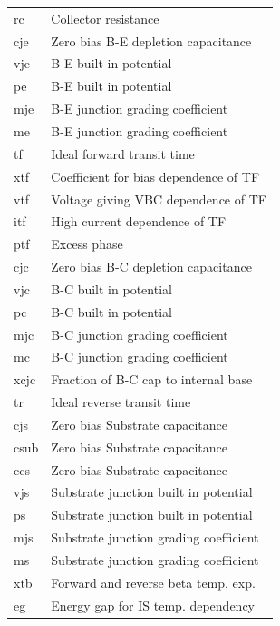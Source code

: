 \begin{longtable}{l l}
{\small rc} & {\small Collector resistance} \\
{\small cje} & {\small Zero bias B-E depletion capacitance} \\
{\small vje} & {\small B-E built in potential} \\
{\small pe} & {\small B-E built in potential} \\
{\small mje} & {\small B-E junction grading coefficient} \\
{\small me} & {\small B-E junction grading coefficient} \\
{\small tf} & {\small Ideal forward transit time} \\
{\small xtf} & {\small Coefficient for bias dependence of TF} \\
{\small vtf} & {\small Voltage giving VBC dependence of TF} \\
{\small itf} & {\small High current dependence of TF} \\
{\small ptf} & {\small Excess phase} \\
{\small cjc} & {\small Zero bias B-C depletion capacitance} \\
{\small vjc} & {\small B-C built in potential} \\
{\small pc} & {\small B-C built in potential} \\
{\small mjc} & {\small B-C junction grading coefficient} \\
{\small mc} & {\small B-C junction grading coefficient} \\
{\small xcjc} & {\small Fraction of B-C cap to internal base} \\
{\small tr} & {\small Ideal reverse transit time} \\
{\small cjs} & {\small Zero bias Substrate capacitance} \\
{\small csub} & {\small Zero bias Substrate capacitance} \\
{\small ccs} & {\small Zero bias Substrate capacitance} \\
{\small vjs} & {\small Substrate junction built in potential} \\
{\small ps} & {\small Substrate junction built in potential} \\
{\small mjs} & {\small Substrate junction grading coefficient} \\
{\small ms} & {\small Substrate junction grading coefficient} \\
{\small xtb} & {\small Forward and reverse beta temp. exp.} \\
{\small eg} & {\small Energy gap for IS temp. dependency} \\

\end{longtable}
